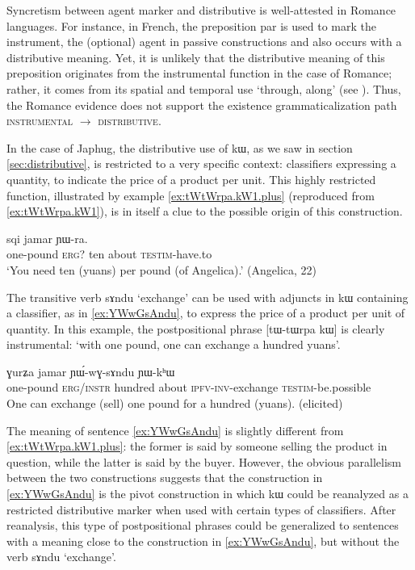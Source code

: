 \documentclass[oldfontcommands,oneside,a4paper,11pt]{article}
\newcommand{\ipa}[1]{{\phon #1}} %
\begin{document}
Syncretism between agent marker and distributive is well-attested in Romance languages. For instance, in French, the preposition  \ipa{par}  is used to mark the instrument, the (optional) agent in passive constructions and also occurs with a distributive meaning. Yet, it is unlikely that the distributive meaning of this preposition originates from the instrumental function in the case of Romance; rather, it comes from its  spatial and temporal use `through, along' (see \citealt[213]{wartburg58few8}). 
Thus, the Romance evidence does not support the existence grammaticalization path \textsc{instrumental} $\rightarrow$ \textsc{distributive}.



In the case of Japhug, the distributive use of \ipa{kɯ}, as we saw in section \ref{sec:distributive}, is restricted to a very specific context: classifiers expressing a quantity, to indicate the price of a product per unit. This highly restricted function, illustrated by example \ref{ex:tWtWrpa.kW1.plus} (reproduced from \ref{ex:tWtWrpa.kW1}), is in itself a clue to the possible origin of this construction.


 \begin{exe} 
\ex \label{ex:tWtWrpa.kW1.plus}
\gll  
[\ipa{tɯ-tɯrpa}] 	\ipa{\textbf{kɯ}} 	\ipa{sqi} 	\ipa{jamar} 	\ipa{ɲɯ-ra.} 	\\
one-pound \textsc{erg?} ten about \textsc{testim}-have.to \\
\glt `You need ten (yuans) per pound (of Angelica).' (Angelica, 22)
\end{exe}  

The transitive verb \ipa{sɤndu} `exchange' can be used with adjuncts in \ipa{kɯ} containing a classifier, as in \ref{ex:YWwGsAndu}, to express the price of a product per unit of quantity. In this example, the postpositional phrase [\ipa{tɯ-tɯrpa} 	\ipa{kɯ}] is clearly instrumental: `with one pound, one can exchange a hundred yuans'.

  \begin{exe}
\ex \label{ex:YWwGsAndu}
\gll 
[\ipa{tɯ-tɯrpa}]  	\ipa{kɯ}  	\ipa{ɣurʑa}  	\ipa{jamar}  	\ipa{ɲɯ́-wɣ-sɤndu}  	\ipa{ɲɯ-kʰɯ}  \\
one-pound \textsc{erg/instr} hundred about \textsc{ipfv-inv}-exchange \textsc{testim}-be.possible \\
\glt One can exchange (sell) one pound for a hundred (yuans). (elicited)
\end{exe}


The meaning of sentence \ref{ex:YWwGsAndu} is slightly different from \ref{ex:tWtWrpa.kW1.plus}: the former is  said by someone selling the product in question, while the latter is said by the buyer. However, the obvious parallelism between the two constructions suggests that the construction in \ref{ex:YWwGsAndu} is the pivot construction in which  \ipa{kɯ} could be reanalyzed as a restricted distributive marker when used with certain types of classifiers. After reanalysis, this type of postpositional phrases could be generalized to sentences with a meaning close to the construction in \ref{ex:YWwGsAndu}, but without the verb  \ipa{sɤndu} `exchange'.
\end{document}
